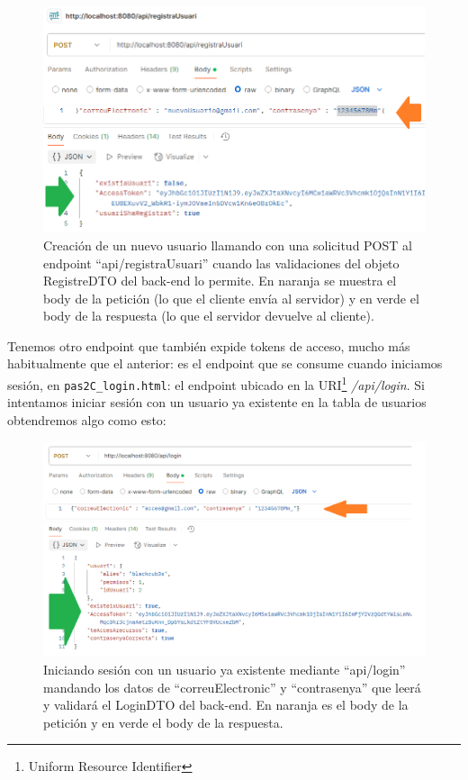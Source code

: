 \documentclass[a4paper,12pt]{report}
\begin{document}
		
		
		\setlength{\abovecaptionskip}{0pt}
		\FloatBarrier
		\begin{figure}[H]
			\centering
			\includegraphics[width=1\textwidth]{img/detallPostmanRegistraUsuari.png}
			\caption{Creación de un nuevo usuario llamando con una solicitud POST al endpoint ``api/registraUsuari'' cuando las validaciones del objeto RegistreDTO del back-end lo permite. En naranja se muestra el body de la petición (lo que el cliente envía al servidor) y en verde el body de la respuesta (lo que el servidor devuelve al cliente).}
			
			\label{fig:detallPostmanRegistraUsuari} 
		\end{figure}
		\FloatBarrier
		
		
		Tenemos otro endpoint que también expide tokens de acceso, mucho más habitualmente que el anterior: es el endpoint que se consume cuando iniciamos sesión, en \texttt{pas2C\_login.html}: el endpoint ubicado en la URI\footnote{Uniform Resource Identifier} \textit{/api/login}. Si intentamos iniciar sesión con un usuario ya existente en la tabla de usuarios obtendremos algo como esto:
		
		\setlength{\abovecaptionskip}{0pt}
		\FloatBarrier
		\begin{figure}[H]
			\centering
			\includegraphics[width=1\textwidth]{img/detallPostmanLogin.png}
			\caption{Iniciando sesión con un usuario ya existente mediante ``api/login'' mandando los datos de ``correuElectronic'' y ``contrasenya'' que leerá y validará el LoginDTO del back-end. En naranja es el body de la petición y en verde el body de la respuesta.}
			
			\label{fig:detallPostmanLogin} 
		\end{figure}
		\FloatBarrier
		
\end{document}

